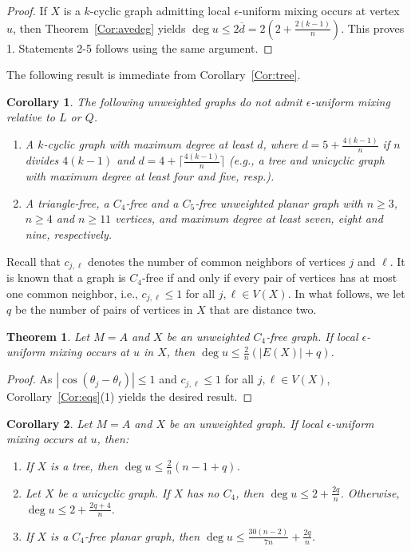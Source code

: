 \documentclass[11pt]{article}
\newtheorem{theorem}{Theorem}
\newtheorem{corollary}{Corollary}
\begin{document}
\begin{proof}
If $X$ is a $k$-cyclic graph admitting local $\epsilon$-uniform mixing occurs at vertex $u$, then Theorem~\ref{Cor:avedeg} yields $\operatorname{deg}u\leq2\overline{d}=2\left(2+\frac{2(k-1)}{n}\right)$. This proves 1. Statements 2-5 follows using the same argument.
\end{proof}

The following result is immediate from Corollary~\ref{Cor:tree}.

\begin{corollary}
The following unweighted graphs do not admit $\epsilon$-uniform mixing relative to $L$ or $Q$.
\begin{enumerate}
\item A $k$-cyclic graph with maximum degree at least $d$, where $d=5+\frac{4(k-1)}{n}$ if $n$ divides $4(k-1)$ and $d=4+\lceil\frac{4(k-1)}{n}\rceil$ (e.g., a tree and unicyclic graph with maximum degree at least four and five, resp.).
\item A triangle-free, a $C_4$-free and a $C_5$-free unweighted planar graph with $n\geq 3$, $n\geq 4$ and $n\geq 11$ vertices, and maximum degree at least seven, eight and nine, respectively.
\end{enumerate}
\end{corollary}

Recall that $c_{j,\ell}$ denotes the number of common neighbors of vertices $j$ and $\ell$. It is known that a graph is $C_4$-free if and only if every pair of vertices has at most one common neighbor, i.e., $c_{j,\ell}\leq 1$ for all $j,\ell\in V(X)$. In what follows, we let $q$ be the number of pairs of vertices in $X$ that are distance two. 

\begin{theorem}
\label{Cor:avedeg1}
Let $M=A$ and $X$ be an unweighted $C_4$-free graph. If local $\epsilon$-uniform mixing occurs at $u$ in $X$, then $\operatorname{deg}u\leq \frac{2}{n}\left(|E(X)|+q\right)$. 
\end{theorem}

\begin{proof}
As $|\cos(\theta_j-\theta_{\ell})|\leq 1$ and $c_{j,\ell}\leq 1$ for all $j,\ell\in V(X)$, Corollary~\ref{Cor:eqs}(1) yields the desired result. 
\end{proof}

\begin{corollary}
\label{umfam}
Let $M=A$ and $X$ be an unweighted graph. If local $\epsilon$-uniform mixing occurs at $u$, then:
\begin{enumerate}
\item If $X$ is a tree, then $\operatorname{deg}u\leq  \frac{2}{n}(n-1+q)$.
\item Let $X$ be a unicyclic graph. If $X$ has no $C_4$, then $\operatorname{deg}u\leq 2+\frac{2q}{n}$. Otherwise, $\operatorname{deg}u\leq  2+\frac{2q+4}{n}$.
\item If $X$ is a $C_4$-free planar graph, then $\operatorname{deg}u\leq \frac{30(n-2)}{7n}+\frac{2q}{n}$. 
\end{enumerate}
\end{corollary}
\end{document}
